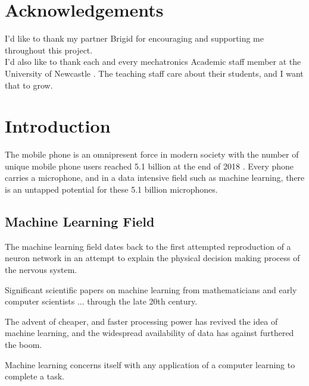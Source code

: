 \documentclass{UoNMCHA}
\numberwithin{equation}{section}
\begin{document}
{\section*{Acknowledgements}
\vspace{-3mm}
I'd like to thank my partner Brigid for encouraging and supporting me throughout this project. \\

I'd also like to thank each and every mechatronics Academic staff member at the University of Newcastle . The teaching staff care about their students, and I want that to grow.
\newpage
\tableofcontents
\newpage
\clearpage \section{Introduction}
 
The mobile phone is an omnipresent force in modern society with the number of unique mobile phone users reached 5.1 billion at the end of 2018 \cite{GSMA}. Every phone carries a microphone, and in a data intensive field such as machine learning, there is an untapped potential for these 5.1 billion microphones. %


\subsection{Machine Learning Field}
The machine learning field dates back to the first attempted reproduction of a neuron network \cite{mcculloch1943logical} in an attempt to explain the physical decision making process of the nervous system.

Significant scientific papers on machine learning from mathematicians and early computer scientists ... through the late 20th century.

The advent of cheaper, and faster processing power has revived the idea of machine learning, and the widespread availability of data has against furthered the boom.

Machine learning concerns itself with any application of a computer learning to complete a task.

}
\end{document}
